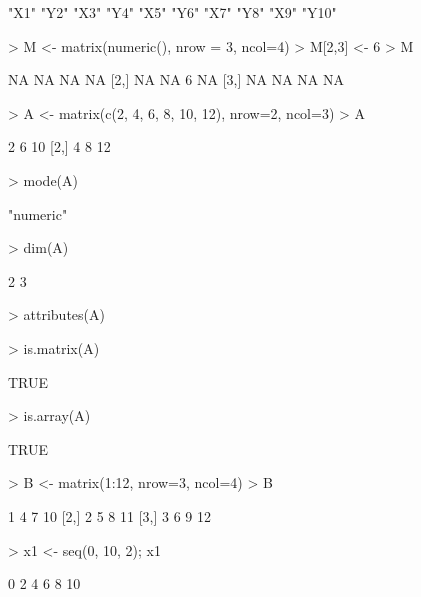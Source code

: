 \documentclass{article}
\begin{document}
\begin{Schunk}
\begin{Soutput}
 [1] "X1"  "Y2"  "X3"  "Y4"  "X5"  "Y6"  "X7"  "Y8"  "X9"  "Y10"
\end{Soutput}
\begin{Sinput}
> M <- matrix(numeric(), nrow = 3, ncol=4)
> M[2,3] <- 6
> M
\end{Sinput}
\begin{Soutput}
     [,1] [,2] [,3] [,4]
[1,]   NA   NA   NA   NA
[2,]   NA   NA    6   NA
[3,]   NA   NA   NA   NA
\end{Soutput}
\begin{Sinput}
> A <- matrix(c(2, 4, 6, 8, 10, 12), nrow=2, ncol=3)
> A
\end{Sinput}
\begin{Soutput}
     [,1] [,2] [,3]
[1,]    2    6   10
[2,]    4    8   12
\end{Soutput}
\begin{Sinput}
> mode(A)
\end{Sinput}
\begin{Soutput}
[1] "numeric"
\end{Soutput}
\begin{Sinput}
> dim(A)
\end{Sinput}
\begin{Soutput}
[1] 2 3
\end{Soutput}
\begin{Sinput}
> attributes(A)
\end{Sinput}
\begin{Sinput}
> is.matrix(A)
\end{Sinput}
\begin{Soutput}
[1] TRUE
\end{Soutput}
\begin{Sinput}
> is.array(A)
\end{Sinput}
\begin{Soutput}
[1] TRUE
\end{Soutput}
\begin{Sinput}
> B <- matrix(1:12, nrow=3, ncol=4)
> B
\end{Sinput}
\begin{Soutput}
     [,1] [,2] [,3] [,4]
[1,]    1    4    7   10
[2,]    2    5    8   11
[3,]    3    6    9   12
\end{Soutput}
\begin{Sinput}
> x1 <- seq(0, 10, 2); x1
\end{Sinput}
\begin{Soutput}
[1]  0  2  4  6  8 10

\end{Soutput}
\end{Schunk}
\end{document}

